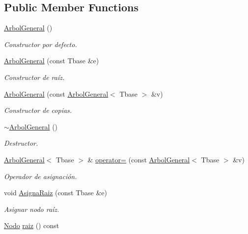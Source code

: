 \subsection*{Public Member Functions}
\begin{DoxyCompactItemize}
\item 
\hyperlink{classArbolGeneral_a2c792965befd8644246118a09a10123c}{Arbol\-General} ()
\begin{DoxyCompactList}\small\item\em Constructor por defecto. \end{DoxyCompactList}\item 
\hyperlink{classArbolGeneral_a8ddac1a024f05bee96f4c259fad76c4c}{Arbol\-General} (const Tbase \&e)
\begin{DoxyCompactList}\small\item\em Constructor de raíz. \end{DoxyCompactList}\item 
\hyperlink{classArbolGeneral_ad7926f03eb051b9691d57f4e508cad4d}{Arbol\-General} (const \hyperlink{classArbolGeneral}{Arbol\-General}$<$ Tbase $>$ \&v)
\begin{DoxyCompactList}\small\item\em Constructor de copias. \end{DoxyCompactList}\item 
\hyperlink{classArbolGeneral_a085c45825063913fb958b704f59033f3}{$\sim$\-Arbol\-General} ()
\begin{DoxyCompactList}\small\item\em Destructor. \end{DoxyCompactList}\item 
\hyperlink{classArbolGeneral}{Arbol\-General}$<$ Tbase $>$ \& \hyperlink{classArbolGeneral_aebd3723e9929b905445127a754a26759}{operator=} (const \hyperlink{classArbolGeneral}{Arbol\-General}$<$ Tbase $>$ \&v)
\begin{DoxyCompactList}\small\item\em Operador de asignación. \end{DoxyCompactList}\item 
void \hyperlink{classArbolGeneral_a84781986cd57390540600494303b0e9d}{Asigna\-Raiz} (const Tbase \&e)
\begin{DoxyCompactList}\small\item\em Asignar nodo raíz. \end{DoxyCompactList}\item 
\hyperlink{classArbolGeneral_a12cc1b74a9095d89bc7334290d332f7a}{Nodo} \hyperlink{classArbolGeneral_ae33520448eb3f38a597b8c27579b5ec8}{raiz} () const 

\end{DoxyCompactItemize}
